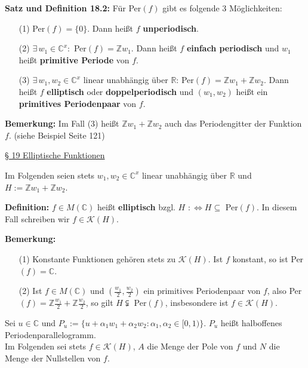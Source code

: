 \documentclass[11pt]{article}
\newcommand{\C}{\mathbb{C}}
\newcommand{\R}{\mathbb{R}}
\newcommand{\Z}{\mathbb{Z}}
\begin{document}
\textbf{Satz und Definition 18.2:} Für Per$(f)$ gibt es folgende 3 Möglichkeiten:
\vspace{-0.6cm}
\begin{itemize}
\item[(1)] Per$(f) = \{ 0 \}$. Dann heißt $f$ \textbf{unperiodisch}. \vspace{-0.2cm}
\item[(2)] $\exists \, w_1 \in \C^x \colon$ Per$(f) = \Z w_1$. Dann heißt $f$ \textbf{einfach periodisch} und $w_1$ heißt \textbf{primitive Periode} von $f$. \vspace{-0.2cm}
\item[(3)] $\exists \, w_1, w_2 \in \C^x$ linear unabhängig über $\R$: Per$(f) = \Z w_1 + \Z w_2$. Dann heißt $f$ \textbf{elliptisch} oder \textbf{doppelperiodisch} und $(w_1, w_2)$ heißt ein \textbf{primitives Periodenpaar} von $f$.
\end{itemize}
\vspace{-0.3cm}

\textbf{Bemerkung:} Im Fall (3) heißt $\Z w_1 + \Z w_2$ auch das Periodengitter der Funktion $f$. (siehe Beispiel Seite 121)

\underline{§ 19 Elliptische Funktionen}

Im Folgenden seien stets $w_1, w_2 \in \C^x$ linear unabhängig über $\R$ und $H := \Z w_1 + \Z w_2$.

\textbf{Definition:} $f \in M(\C)$ heißt \textbf{elliptisch} bzgl. $H$ $:\Leftrightarrow H \subseteq$ Per$(f)$. In diesem Fall schreiben wir $f \in \mathcal{K}(H)$.

\newpage
\textbf{Bemerkung:}
\vspace{-0.6cm}
\begin{itemize}
\item[(1)] Konstante Funktionen gehören stets zu $\mathcal{K}(H)$. Ist $f$ konstant, so ist Per$(f) = \C$. \vspace{-0.2cm}
\item[(2)] Ist $f \in M(\C)$ und $(\frac{w_1}{2}, \frac{w_2}{2})$ ein primitives Periodenpaar von $f$, also Per$(f) = \Z \frac{w_1}{2} + \Z \frac{w_2}{2}$, so gilt $H \subsetneqq$ Per$(f)$, insbesondere ist $f \in \mathcal{K}(H)$.
\end{itemize}
\vspace{-0.6cm}

Sei $u \in \C$ und $P_u := \{ u+\alpha_1 w_1 + \alpha_2 w_2 \colon \alpha_1, \alpha_2 \in [0,1) \}$. $P_u$ heißt halboffenes Periodenparallelogramm. \\
Im Folgenden sei stets $f \in \mathcal{K}(H)$, $A$ die Menge der Pole von $f$ und $N$ die Menge der Nullstellen von $f$.
\end{document}
